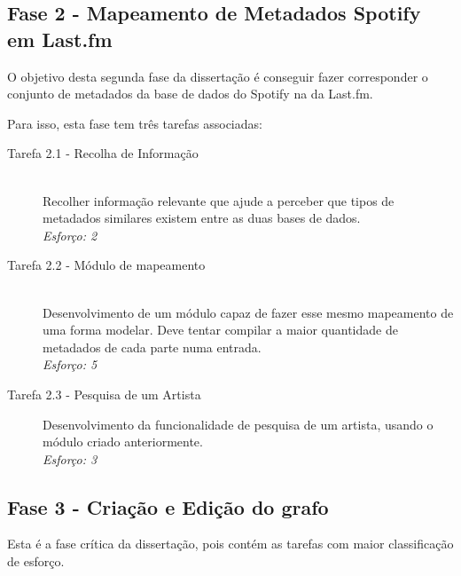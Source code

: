 
  \subsection{Fase 2 - Mapeamento de Metadados Spotify em Last.fm} %
  \label{sub:dev_mapeamento}

    O objetivo desta segunda fase da dissertação é conseguir fazer corresponder o conjunto de metadados da base de dados do Spotify na da Last.fm.
    
    Para isso, esta fase tem três tarefas associadas:
    \begin{description}
      \item[Tarefa 2.1 - Recolha de Informação] \hfill \\
        Recolher informação relevante que ajude a perceber que tipos de metadados similares existem entre as duas bases de dados. \\
        \emph{Esforço: 2}

      \item[Tarefa 2.2 - Módulo de mapeamento] \hfill \\
        Desenvolvimento de um módulo capaz de fazer esse mesmo mapeamento de uma forma modelar.
        Deve tentar compilar a maior quantidade de metadados de cada parte numa entrada.\\
        \emph{Esforço: 5}

      \item[Tarefa 2.3 - Pesquisa de um Artista]
        Desenvolvimento da funcionalidade de pesquisa de um artista, usando o módulo criado anteriormente. \\
        \emph{Esforço: 3}

    \end{description}


  \subsection{Fase 3 - Criação e Edição do grafo} %
  \label{sub:dev_grafo}
  
    Esta é a fase crítica da dissertação, pois contém as tarefas com maior classificação de esforço.

